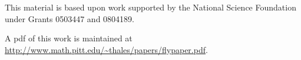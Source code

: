 \noindent

\bigskip\noindent
This material is based upon work supported by the National Science
Foundation under
Grants 0503447 and 0804189.

\bigskip\noindent\svninfo 

\bigskip\noindent
A pdf of this work is maintained at\hfill\break 
\url{http://www.math.pitt.edu/~thales/papers/flypaper.pdf}.




\smallskip
\newpage

